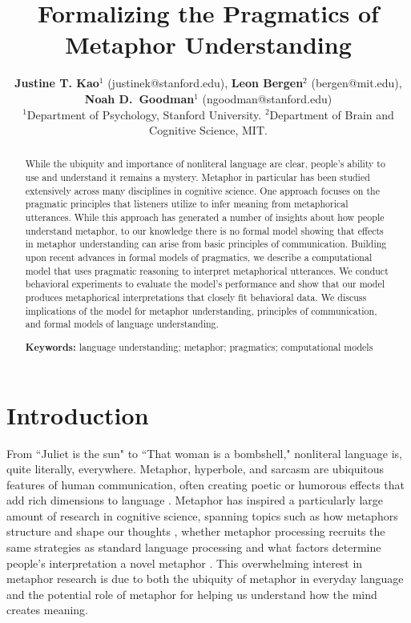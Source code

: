 \documentclass[10pt,letterpaper]{article}
\title{Formalizing the Pragmatics of Metaphor Understanding}
\author{{\large {\bf Justine T. Kao$^1$} (justinek@stanford.edu)}, {\large {\bf Leon Bergen$^2$} (bergen@mit.edu)}, {\large {\bf Noah D.~Goodman$^1$} (ngoodman@stanford.edu)}\\
  $^1$Department of Psychology, Stanford University. $^2$Department of Brain and Cognitive Science, MIT. }
\begin{document}
\maketitle
\begin{abstract}
While the ubiquity and importance of nonliteral language are clear, people's ability to use and understand it remains a mystery. Metaphor in particular has been studied extensively across many disciplines in cognitive science. One approach focuses on the pragmatic principles that listeners utilize to infer meaning from metaphorical utterances. While this approach has generated a number of insights about how people understand metaphor, to our knowledge there is no formal model showing that effects in metaphor understanding can arise from basic principles of communication. Building upon recent advances in formal models of pragmatics, we describe a computational model that uses pragmatic reasoning to interpret metaphorical utterances. We conduct behavioral experiments to evaluate the model's performance and show that our model produces metaphorical interpretations that closely fit behavioral data. We discuss implications of the model for metaphor understanding, principles of communication, and formal models of language understanding.

\textbf{Keywords:} 
language understanding; metaphor; pragmatics; computational models
\end{abstract}


\section{Introduction}
From ``Juliet is the sun" to ``That woman is a bombshell," nonliteral language is, quite literally, everywhere. Metaphor, hyperbole, and sarcasm are ubiquitous features of human communication, often creating poetic or humorous effects that add rich dimensions to language \cite{glucksberg2001understanding, pilkington2000poetic, lakoff2009more, roberts1994people}. Metaphor has inspired a particularly large amount of research in cognitive science, spanning topics such as how metaphors structure and shape our thoughts \cite{ortony1993metaphor, lakoff1993contemporary, thibodeau2011metaphors}, whether metaphor processing recruits the same strategies as standard language processing \cite{giora1997understanding, gibbs2002new, glucksberg1993metaphors} and what factors determine people's interpretation a novel metaphor \cite{gentner1997alignment, blasko1993effects, tourangeau1981aptness, kintsch2002metaphor}. This overwhelming interest in metaphor research is due to both the ubiquity of metaphor in everyday language and the potential role of metaphor for helping us understand how the mind creates meaning. 
\end{document}
